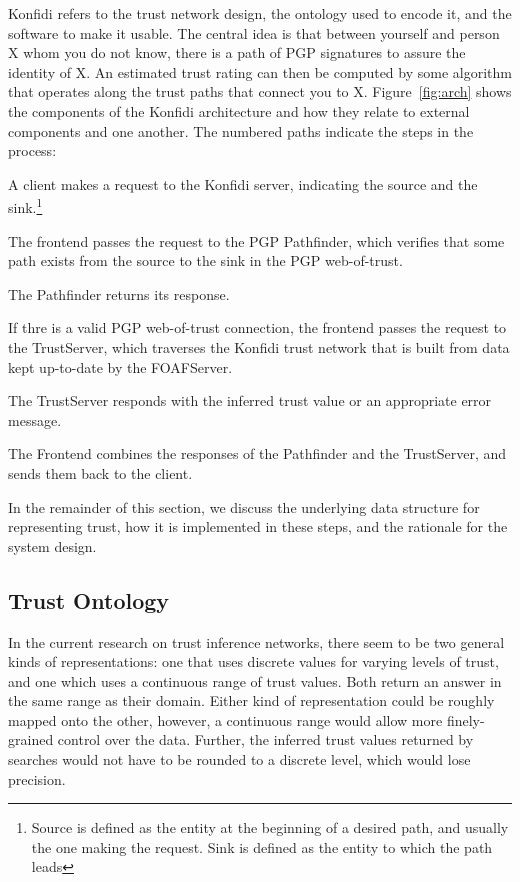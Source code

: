 \documentclass[letterpaper]{www2006-submission}
\newenvironment{enumerate_tight}{
\begin{enumerate}
  \setlength{\itemsep}{1pt}
  \setlength{\parskip}{0pt}
  \setlength{\parsep}{0pt}}{\end{enumerate}
}
\begin{document}
Konfidi refers to the trust network design, the ontology used to encode it, and the software to make it usable.  The central idea is that between yourself and person X whom you do not know, there is a path of PGP signatures to assure the identity of X.  An estimated trust rating can then be computed by some algorithm that operates along the trust paths that connect you to X.  Figure~\ref{fig:arch} shows the components of the Konfidi architecture and how they relate to external components and one another.  The numbered paths indicate the steps in the process:  

\begin{enumerate_tight}
\item  A client makes a request to the Konfidi server, indicating the source and the sink.\footnote{Source is defined as the entity at the beginning of a desired path, and usually the one making the request.  Sink is defined as the entity to which the path leads}
\item  The frontend passes the request to the PGP Pathfinder, which verifies that some path exists from the source to the sink in the PGP web-of-trust.
\item  The Pathfinder returns its response.
\item  If thre is a valid PGP web-of-trust connection, the frontend passes the request to the TrustServer, which traverses the Konfidi trust network that is built from data kept up-to-date by the FOAFServer.
\item  The TrustServer responds with the inferred trust value or an appropriate error message.
\item  The Frontend combines the responses of the Pathfinder and the TrustServer, and sends them back to the client.
\end{enumerate_tight}

In the remainder of this section, we discuss the underlying data structure for representing trust, how it is implemented in these steps, and the rationale for the system design.

\subsection{Trust Ontology}
In the current research on trust inference networks, there seem to be two general kinds of representations:  one that uses discrete values for varying levels of trust, and one which uses a continuous range of trust values.  Both return an answer in the same range as their domain.  Either kind of representation could be roughly mapped onto the other, however, a continuous range would allow more finely-grained control over the data.  Further, the inferred trust values returned by searches would not have to be rounded to a discrete level, which would lose precision.
\end{document}
